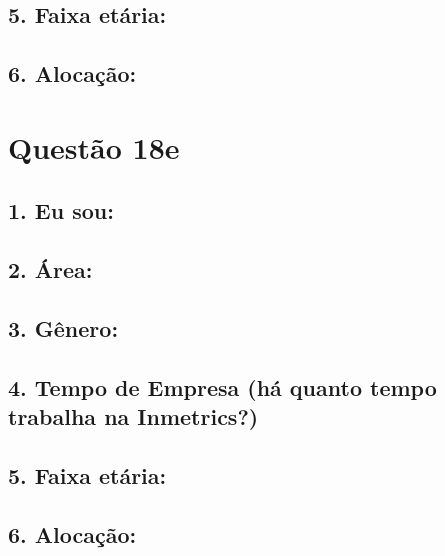 \documentclass[]{book}
\begin{document}
\hypertarget{faixa-etaria-43}{%
\subsection{5. Faixa etária:}\label{faixa-etaria-43}}

\hypertarget{alocacao-43}{%
\subsection{6. Alocação:}\label{alocacao-43}}

\hypertarget{questao-18e}{%
\section{Questão 18e}\label{questao-18e}}

\hypertarget{eu-sou-44}{%
\subsection{1. Eu sou:}\label{eu-sou-44}}

\hypertarget{area-44}{%
\subsection{2. Área:}\label{area-44}}

\hypertarget{genero-44}{%
\subsection{3. Gênero:}\label{genero-44}}

\hypertarget{tempo-de-empresa-ha-quanto-tempo-trabalha-na-inmetrics-44}{%
\subsection{4. Tempo de Empresa (há quanto tempo trabalha na Inmetrics?)}\label{tempo-de-empresa-ha-quanto-tempo-trabalha-na-inmetrics-44}}

\hypertarget{faixa-etaria-44}{%
\subsection{5. Faixa etária:}\label{faixa-etaria-44}}

\hypertarget{alocacao-44}{%
\subsection{6. Alocação:}\label{alocacao-44}}
\end{document}
